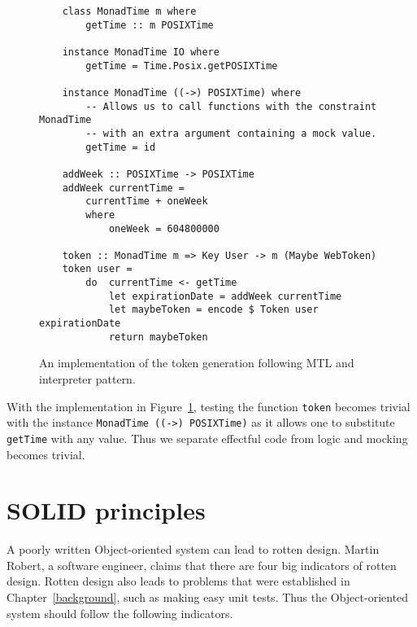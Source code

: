 \begin{figure}[H]
    \begin{lstlisting}
    class MonadTime m where
        getTime :: m POSIXTime

    instance MonadTime IO where
        getTime = Time.Posix.getPOSIXTime

    instance MonadTime ((->) POSIXTime) where
        -- Allows us to call functions with the constraint MonadTime
        -- with an extra argument containing a mock value.
        getTime = id

    addWeek :: POSIXTime -> POSIXTime
    addWeek currentTime =
        currentTime + oneWeek
        where
            oneWeek = 604800000

    token :: MonadTime m => Key User -> m (Maybe WebToken)
    token user =
        do  currentTime <- getTime
            let expirationDate = addWeek currentTime
            let maybeToken = encode $ Token user expirationDate
            return maybeToken
    \end{lstlisting}
    \caption{An implementation of the token generation following MTL and
    interpreter pattern.}
    \label{tokencorrect}
\end{figure}

With the implementation in Figure~\ref{tokencorrect}, testing the function
\texttt{token} becomes trivial with the instance \texttt{MonadTime ((->)
POSIXTime)} as it allows one to substitute \texttt{getTime} with any value. Thus
we separate effectful code from logic and mocking becomes trivial.


\section{SOLID principles}\label{oop}


A poorly written Object-oriented system can lead to rotten design. Martin
Robert, a software engineer, claims that there are four big indicators of rotten
design. Rotten design also leads to problems that were established in
Chapter~\ref{background}, such as making easy unit tests. Thus the
Object-oriented system should follow the following indicators.


